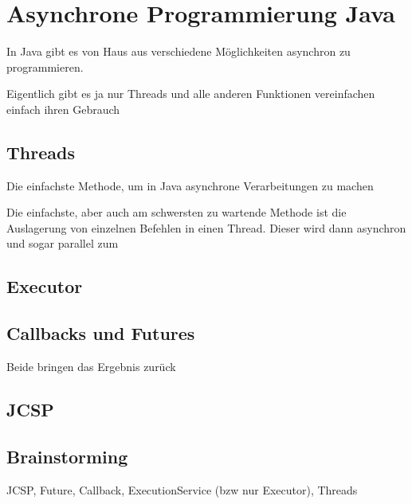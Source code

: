 \section{Asynchrone Programmierung Java}

In Java gibt es von Haus aus verschiedene Möglichkeiten asynchron zu programmieren.

Eigentlich gibt es ja nur Threads und alle anderen Funktionen vereinfachen einfach ihren Gebrauch

\subsection{Threads}

Die einfachste Methode, um in Java asynchrone Verarbeitungen zu machen



Die einfachste, aber auch am schwersten zu wartende Methode ist die Auslagerung von einzelnen Befehlen in einen Thread. Dieser wird dann asynchron und sogar parallel zum


\subsection{Executor}

\subsection{Callbacks und Futures}
Beide bringen das Ergebnis zurück


\subsection{JCSP}

\subsection{Brainstorming}
JCSP, Future, Callback, ExecutionService (bzw nur Executor), Threads
